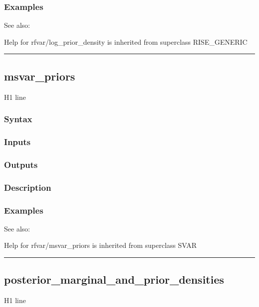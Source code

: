 \documentclass[letterpaper,10pt,english]{sphinxmanual}
\begin{document}
\subsubsection{Examples}
\label{classes/models/@rfvar/rfvar:id73}
See also:

Help for rfvar/log\_prior\_density is inherited from superclass RISE\_GENERIC


\bigskip\hrule{}\bigskip



\subsection{msvar\_priors}
\label{classes/models/@rfvar/rfvar:msvar-priors}\label{classes/models/@rfvar/rfvar:id74}
H1 line


\subsubsection{Syntax}
\label{classes/models/@rfvar/rfvar:id75}

\subsubsection{Inputs}
\label{classes/models/@rfvar/rfvar:id76}

\subsubsection{Outputs}
\label{classes/models/@rfvar/rfvar:id77}

\subsubsection{Description}
\label{classes/models/@rfvar/rfvar:id78}

\subsubsection{Examples}
\label{classes/models/@rfvar/rfvar:id79}
See also:

Help for rfvar/msvar\_priors is inherited from superclass SVAR


\bigskip\hrule{}\bigskip



\subsection{posterior\_marginal\_and\_prior\_densities}
\label{classes/models/@rfvar/rfvar:id80}\label{classes/models/@rfvar/rfvar:posterior-marginal-and-prior-densities}
H1 line
\end{document}
